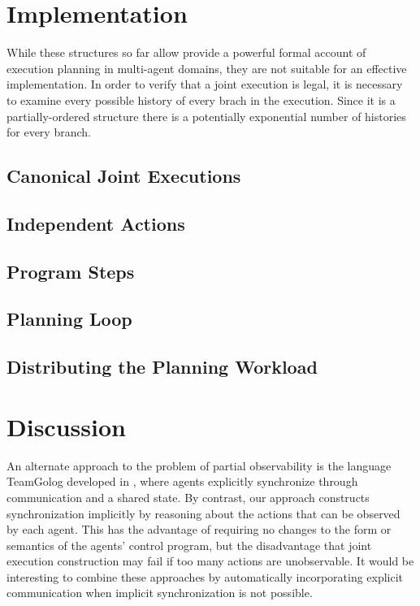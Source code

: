\section{Implementation\label{sec:JointExec:Implementation}}

While these structures so far allow provide a powerful formal account
of execution planning in multi-agent domains, they are not suitable
for an effective implementation. In order to verify that a joint execution
is legal, it is necessary to examine every possible history of every
brach in the execution. Since it is a partially-ordered structure
there is a potentially exponential number of histories for every branch.


\subsection{Canonical Joint Executions}


\subsection{Independent Actions\label{sec:JointExec:IndepActs}}


\subsection{Program Steps}


\subsection{Planning Loop}


\subsection{Distributing the Planning Workload}


\section{Discussion\label{sec:JointExec:Discussion}}

An alternate approach to the problem of partial observability is the
language TeamGolog developed in \citep{farinelli07team_golog}, where
agents explicitly synchronize through communication and a shared state.
By contrast, our approach constructs synchronization implicitly by
reasoning about the actions that can be observed by each agent. This
has the advantage of requiring no changes to the form or semantics
of the agents' control program, but the disadvantage that joint execution
construction may fail if too many actions are unobservable. It would
be interesting to combine these approaches by automatically incorporating
explicit communication when implicit synchronization is not possible.

